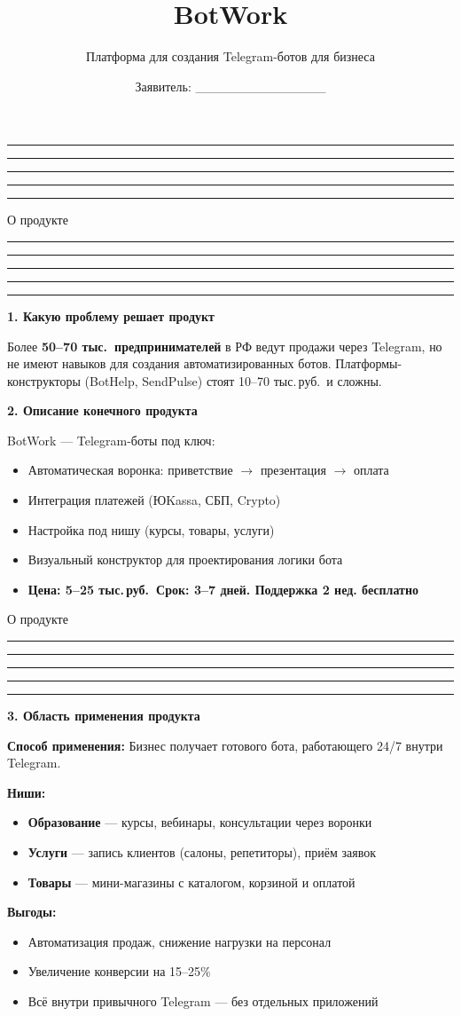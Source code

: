 \documentclass[aspectratio=169, 11pt]{beamer}
\title{\textcolor{cPurple}{\Huge BotWork}}
\subtitle{Платформа для создания Telegram-ботов для бизнеса}
\author{Заявитель: \_\_\_\_\_\_\_\_\_\_\_\_\_\_}
\institute{Студенческий Стартап --- VII очередь}
\date{}
\newcommand{\cbar}{%
  \textcolor{cPink}{\rule{0.2\linewidth}{2pt}}%
  \textcolor{cPurple}{\rule{0.2\linewidth}{2pt}}%
  \textcolor{cRed}{\rule{0.2\linewidth}{2pt}}%
  \textcolor{cOrange}{\rule{0.2\linewidth}{2pt}}%
  \textcolor{cBlue}{\rule{0.2\linewidth}{2pt}}\par\medskip}
\newcommand{\R}{\,руб.}
\begin{document}
\begin{frame}[plain]
\titlepage
\centering\cbar
\end{frame}

\begin{frame}{О продукте}
\cbar
\textbf{1. Какую проблему решает продукт}

\smallskip
Более \textbf{50--70 тыс.\ предпринимателей} в РФ ведут продажи через Telegram, но не имеют навыков для создания автоматизированных ботов. Платформы-конструкторы (BotHelp, SendPulse) стоят 10--70 тыс.\R\ и сложны.

\medskip
\textbf{2. Описание конечного продукта}

\smallskip
BotWork --- Telegram-боты \guillemotleft{}под ключ\guillemotright{}:
\begin{itemize}\setlength\itemsep{0pt}
  \item Автоматическая воронка: приветствие $\to$ презентация $\to$ оплата
  \item Интеграция платежей (ЮKassa, СБП, Crypto)
  \item Настройка под нишу (курсы, товары, услуги)
  \item Визуальный конструктор для проектирования логики бота
  \item \textcolor{cRed}{\textbf{Цена: 5--25 тыс.\R\ Срок: 3--7 дней. Поддержка 2 нед. бесплатно}}
\end{itemize}
\end{frame}

\begin{frame}{О продукте}
\cbar
\textbf{3. Область применения продукта}

\medskip
\textbf{\textcolor{cGray}{Способ применения:}} Бизнес получает готового бота, работающего 24/7 внутри Telegram.

\medskip
\textbf{\textcolor{cGray}{Ниши:}}
\begin{itemize}\setlength\itemsep{0pt}
  \item \textbf{Образование} --- курсы, вебинары, консультации через воронки
  \item \textbf{Услуги} --- запись клиентов (салоны, репетиторы), приём заявок
  \item \textbf{Товары} --- мини-магазины с каталогом, корзиной и оплатой
\end{itemize}

\medskip
\textbf{\textcolor{cGray}{Выгоды:}}
\begin{itemize}\setlength\itemsep{0pt}
  \item Автоматизация продаж, снижение нагрузки на персонал
  \item Увеличение конверсии на 15--25\%
  \item Всё внутри привычного Telegram --- без отдельных приложений
\end{itemize}
\end{frame}
\end{document}
